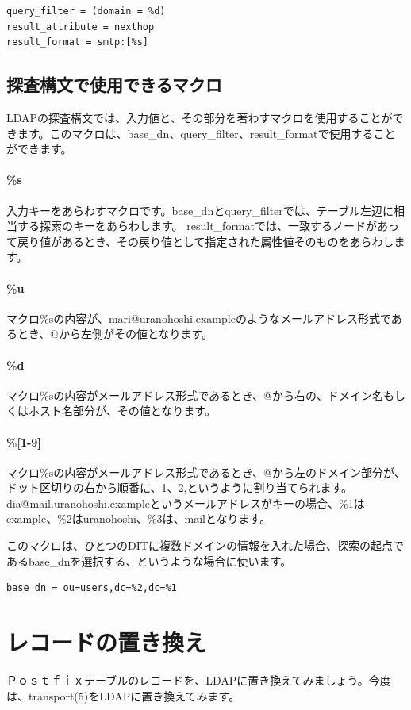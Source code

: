 \begin{verbatim}
query_filter = (domain = %d)
result_attribute = nexthop
result_format = smtp:[%s]
\end{verbatim}

\subsection{探査構文で使用できるマクロ}

LDAPの探査構文では、入力値と、その部分を著わすマクロを使用することができます。このマクロは、base\_dn、query\_filter、result\_formatで使用することができます。

\paragraph{\%s}
入力キーをあらわすマクロです。base\_dnとquery\_filterでは、テーブル左辺に相当する探索のキーをあらわします。
result\_formatでは、一致するノードがあって戻り値があるとき、その戻り値として指定された属性値そのものをあらわします。

\paragraph{\%u}
マクロ\%sの内容が、mari@uranohoshi.exampleのようなメールアドレス形式であるとき、@から左側がその値となります。

\paragraph{\%d}
マクロ\%sの内容がメールアドレス形式であるとき、@から右の、ドメイン名もしくはホスト名部分が、その値となります。

\paragraph{\%[1-9]}
マクロ\%sの内容がメールアドレス形式であるとき、@から左のドメイン部分が、ドット区切りの右から順番に、1、2,というように割り当てられます。dia@mail.uranohoshi.exampleというメールアドレスがキーの場合、\%1はexample、\%2はuranohoshi、\%3は、mailとなります。

このマクロは、ひとつのDITに複数ドメインの情報を入れた場合、探索の起点であるbase\_dnを選択する、というような場合に使います。

\begin{verbatim}
base_dn = ou=users,dc=%2,dc=%1
\end{verbatim}

\section{レコードの置き換え}
Ｐｏｓｔｆｉｘテーブルのレコードを、LDAPに置き換えてみましょう。今度は、transport(5)をLDAPに置き換えてみます。

